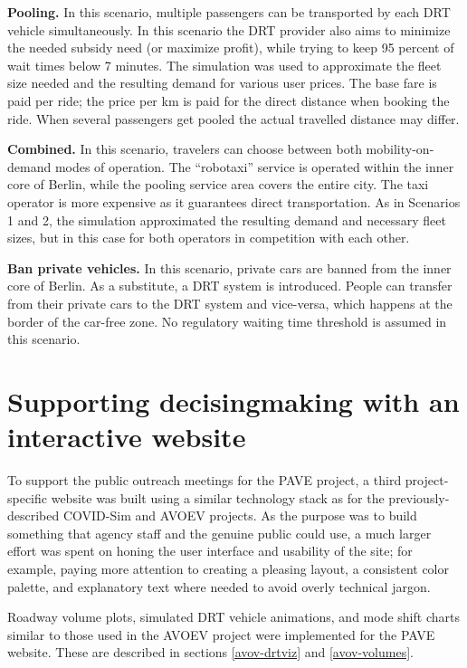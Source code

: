 \textbf{Pooling.} In this scenario, multiple passengers can be transported by each DRT vehicle simultaneously. In this scenario the DRT provider also aims to minimize the needed subsidy need (or maximize profit),  while trying to keep 95 percent of wait times below 7 minutes. The simulation was used to approximate the fleet size needed and the resulting demand for various user prices. The base fare is paid per ride; the price per km is paid for the direct distance when booking the ride. When several passengers get pooled the actual travelled distance may differ.

\textbf{Combined.} In this scenario, travelers can choose between both mobility-on-demand modes of operation. The ``robotaxi'' service is operated within the inner core of Berlin, while the pooling service area covers the entire city. The taxi operator is more expensive as it guarantees direct transportation. As in Scenarios 1 and 2, the simulation approximated the resulting demand and necessary fleet sizes, but in this case for both operators in competition with each other.

\textbf{Ban private vehicles.} In this scenario, private cars are banned from the inner core of Berlin. As a substitute, a DRT system is introduced. People can transfer from their private cars to the DRT system and vice-versa, which happens at the border of the car-free zone. No regulatory waiting time threshold is assumed in this scenario.

\section{Supporting decisingmaking with an interactive website}
\label{pave-site-features}

To support the public outreach meetings for the PAVE project, a third project-specific website was built using a similar technology stack as for the previously-described COVID-Sim and AVOEV projects. As the purpose was to build something that agency staff and the genuine public could use, a much larger effort was spent on honing the user interface and usability of the site; for example, paying more attention to creating a pleasing layout, a consistent color palette, and explanatory text where needed to avoid overly technical jargon.

Roadway volume plots, simulated DRT vehicle animations, and mode shift charts similar to those used in the AVOEV project were implemented for the PAVE website. These are described in sections \ref{avov-drtviz} and \ref{avov-volumes}.


